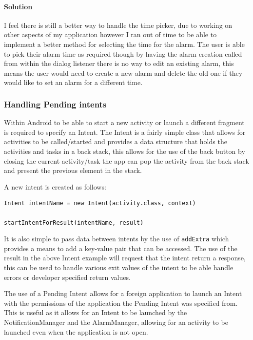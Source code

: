 \paragraph{Solution}\label{solution-1}

I feel there is still a better way to handle the time picker, due to
working on other aspects of my application however I ran out of time to
be able to implement a better method for selecting the time for the
alarm. The user is able to pick their alarm time as required though by
having the alarm creation called from within the dialog listener there
is no way to edit an existing alarm, this means the user would need to
create a new alarm and delete the old one if they would like to set an
alarm for a different time.

\subsubsection{Handling Pending intents}\label{handling-pending-intents}

Within Android to be able to start a new activity or launch a different
fragment is required to specify an Intent. The Intent is a fairly simple
class that allows for activities to be called/started and provides a
data structure that holds the activities and tasks in a back stack, this
allows for the use of the back button by closing the current
activity/task the app can pop the activity from the back stack and
present the previous element in the stack.

A new intent is created as follows:

\begin{lstlisting}
Intent intentName = new Intent(activity.class, context)

startIntentForResult(intentName, result)
\end{lstlisting}

It is also simple to pass data between intents by the use of
\lstinline!addExtra! which provides a means to add a key-value pair that
can be accessed. The use of the result in the above Intent example will
request that the intent return a response, this can be used to handle
various exit values of the intent to be able handle errors or developer
specified return values.

The use of a Pending Intent allows for a foreign application to launch
an Intent with the permissions of the application the Pending Intent was
specified from. This is useful as it allows for an Intent to be launched
by the NotificationManager and the AlarmManager, allowing for an
activity to be launched even when the application is not open.

